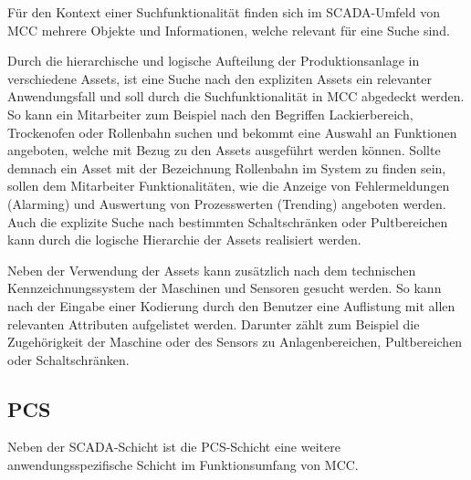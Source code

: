 Für den Kontext einer Suchfunktionalität finden sich im SCADA-Umfeld von MCC mehrere Objekte und Informationen, welche relevant für eine Suche sind.

Durch die hierarchische und logische Aufteilung der Produktionsanlage in verschiedene Assets, ist eine Suche nach den expliziten Assets ein relevanter Anwendungsfall und soll durch die Suchfunktionalität in MCC abgedeckt werden. So kann ein Mitarbeiter zum Beispiel nach den Begriffen \glqq Lackierbereich\grqq{}, \glqq Trockenofen\grqq{} oder \glqq Rollenbahn\grqq{} suchen und bekommt eine Auswahl an Funktionen angeboten, welche mit Bezug zu den Assets ausgeführt werden können. Sollte demnach ein Asset mit der Bezeichnung \glqq Rollenbahn\grqq{} im System zu finden sein, sollen dem Mitarbeiter Funktionalitäten, wie die Anzeige von Fehlermeldungen (Alarming) und Auswertung von Prozesswerten (Trending) angeboten werden. Auch die explizite Suche nach bestimmten Schaltschränken oder Pultbereichen kann durch die logische Hierarchie der Assets realisiert werden.

Neben der Verwendung der Assets kann zusätzlich nach dem technischen Kennzeichnungssystem der Maschinen und Sensoren gesucht werden. So kann nach der Eingabe einer Kodierung durch den Benutzer eine Auflistung mit allen relevanten Attributen aufgelistet werden. Darunter zählt zum Beispiel die Zugehörigkeit der Maschine oder des Sensors zu Anlagenbereichen, Pultbereichen oder Schaltschränken.


\subsection{PCS\label{subsec3.1.4:Unterunterpunkt-4}}

Neben der \glqq SCADA\grqq{}-Schicht ist die \glqq PCS\grqq{}-Schicht eine weitere anwendungsspezifische Schicht im Funktionsumfang von MCC.

